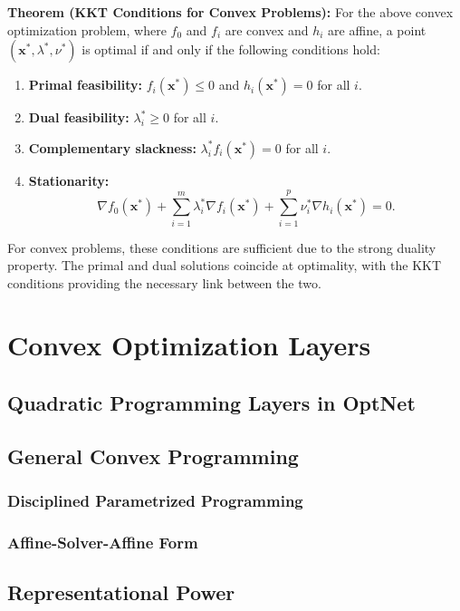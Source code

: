 \documentclass{article}
\begin{document}
\textbf{Theorem (KKT Conditions for Convex Problems):}  
For the above convex optimization problem, where $f_0$ and $f_i$ are convex and $h_i$ are affine, a point $(\mathbf{x}^*, \lambda^*, \nu^*)$ is optimal if and only if the following conditions hold:
\begin{enumerate}
    \item \textbf{Primal feasibility:} $f_i(\mathbf{x}^*) \leq 0$ and $h_i(\mathbf{x}^*) = 0$ for all $i$.
    \item \textbf{Dual feasibility:} $\lambda_i^* \geq 0$ for all $i$.
    \item \textbf{Complementary slackness:} $\lambda_i^* f_i(\mathbf{x}^*) = 0$ for all $i$.
    \item \textbf{Stationarity:}
    \[
    \nabla f_0(\mathbf{x}^*) + \sum_{i=1}^m \lambda_i^* \nabla f_i(\mathbf{x}^*) + \sum_{i=1}^p \nu_i^* \nabla h_i(\mathbf{x}^*) = 0.
    \]
\end{enumerate}

For convex problems, these conditions are sufficient due to the strong duality property. The primal and dual solutions coincide at optimality, with the KKT conditions providing the necessary link between the two.

\section{Convex Optimization Layers}

\subsection{Quadratic Programming Layers in OptNet}

\subsection{General Convex Programming}
    \subsubsection{Disciplined Parametrized Programming}
    \subsubsection{Affine-Solver-Affine Form}
\subsection{Representational Power}
\end{document}
